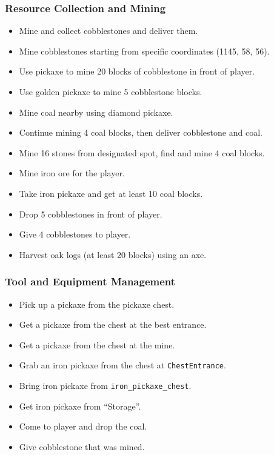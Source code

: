 \subsubsection{Resource Collection and Mining}
\begin{itemize}
  \item Mine and collect cobblestones and deliver them.
  \item Mine cobblestones starting from specific coordinates (1145, 58, 56).
  \item Use pickaxe to mine 20 blocks of cobblestone in front of player.
  \item Use golden pickaxe to mine 5 cobblestone blocks.
  \item Mine coal nearby using diamond pickaxe.
  \item Continue mining 4 coal blocks, then deliver cobblestone and coal.
  \item Mine 16 stones from designated spot, find and mine 4 coal blocks.
  \item Mine iron ore for the player.
  \item Take iron pickaxe and get at least 10 coal blocks.
  \item Drop 5 cobblestones in front of player.
  \item Give 4 cobblestones to player.
  \item Harvest oak logs (at least 20 blocks) using an axe.
\end{itemize}

\appxsmallsep
\subsubsection{Tool and Equipment Management}
\begin{itemize}
  \item Pick up a pickaxe from the pickaxe chest.
  \item Get a pickaxe from the chest at the best entrance.
  \item Get a pickaxe from the chest at the mine.
  \item Grab an iron pickaxe from the chest at \texttt{ChestEntrance}.
  \item Bring iron pickaxe from \texttt{iron\_pickaxe\_chest}.
  \item Get iron pickaxe from ``Storage''.
  \item Come to player and drop the coal.
  \item Give cobblestone that was mined.
\end{itemize}

